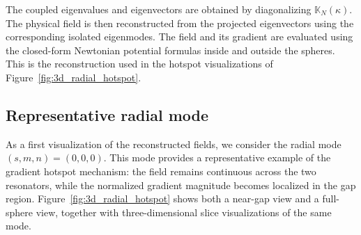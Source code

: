 \documentclass[10pt]{article}
\numberwithin{equation}{section}
\begin{document}
The coupled eigenvalues and eigenvectors are obtained by diagonalizing $\mathbb K_N(\kappa)$. The physical field is then reconstructed from the projected eigenvectors using the corresponding isolated eigenmodes. The field and its gradient are evaluated using the closed-form Newtonian potential formulas inside and outside the spheres. This is the reconstruction used in the hotspot visualizations of Figure~\ref{fig:3d_radial_hotspot}.










\subsection{Representative radial mode}

As a first visualization of the reconstructed fields, we consider the radial mode $(s,m,n)=(0,0,0)$. This mode provides a representative example of the gradient hotspot mechanism: the field remains continuous across the two resonators, while the normalized gradient magnitude becomes localized in the gap region. Figure~\ref{fig:3d_radial_hotspot} shows both a near-gap view and a full-sphere view, together with three-dimensional slice visualizations of the same mode.
\end{document}
